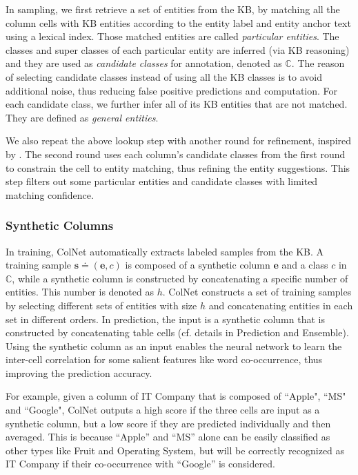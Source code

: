 \documentclass[letterpaper]{article}
\newcommand{\rv}[1]{{\color{black}#1}}
\newcommand{\camera}[1]{{\color{black}#1}}
\newcommand{\ColNet}{\textsf{ColNet}\xspace}
\begin{document}
In sampling, we first retrieve a set of entities from the KB, 
by matching all the column cells with KB entities according to the entity label and entity anchor text using a lexical index.
Those matched entities are called \textit{particular entities}. 
The classes and super classes of each particular entity are  inferred (via KB reasoning) and
\rv{they are used 
as \textit{candidate classes} for annotation, denoted as $\mathbb{C}$.
The reason of selecting candidate classes instead of using all the KB classes is to avoid additional noise, thus reducing false positive predictions and computation.
For each candidate class, we further infer all of its KB entities that are not matched.
They are defined as \textit{general entities}.
}

We also repeat the above lookup step with another round for refinement, 
\rv{inspired by \cite{syed2010exploiting,mulwad2010using}.}
The second round uses each column's candidate classes from the first round to constrain the cell to entity matching,
thus refining the \camera{entity suggestions}.
\camera{This step} filters out some particular entities and candidate classes with limited matching confidence.


\subsubsection{Synthetic Columns}
\rv{In training, \ColNet automatically extracts labeled samples from the KB.
A training sample $\bm{s} \doteq (\bm{e}, c)$ is composed of 
a synthetic column $\bm{e}$ and a class $c$ in $\mathbb{C}$,
while a synthetic column is constructed by concatenating a specific number of entities.
This number is denoted as $h$.
}
\rv{\ColNet constructs a set of training samples by selecting different sets of entities with size $h$ and concatenating entities in each set in different orders.
}
\rv{In prediction, the input is a synthetic column that is constructed by concatenating table cells (cf. details in Prediction and Ensemble).}
Using the synthetic column as an input enables the neural network to learn the inter-cell correlation for some salient features like word co-occurrence, 
thus improving the prediction accuracy.

\rv{For example, given a column of IT Company that is composed of ``Apple", ``MS" and ``Google",
\ColNet outputs a high score if the three cells are input as a synthetic column,
but a low score if they \camera{are} predicted individually and then averaged.
This is because ``Apple'' and ``MS'' alone can be easily classified as other types like Fruit and \camera{Operating} System, 
but will be correctly recognized as IT Company if their co-occurrence with ``Google'' is considered.
}
\end{document}
